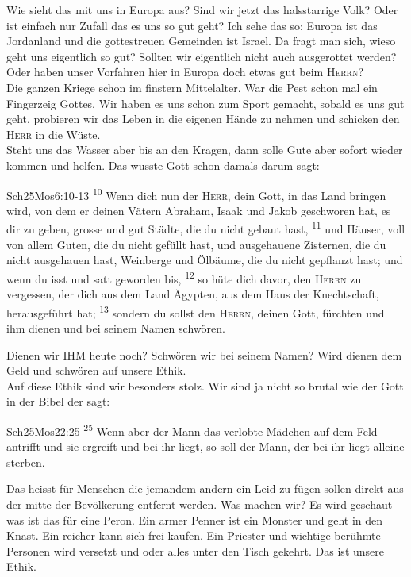 Wie sieht das mit uns in Europa aus? Sind wir jetzt das halsstarrige Volk? Oder ist einfach nur Zufall das es uns so gut geht? Ich sehe das so: Europa ist das Jordanland und die gottestreuen Gemeinden ist Israel.
Da fragt man sich, wieso geht uns eigentlich so gut? Sollten wir eigentlich nicht auch ausgerottet werden? Oder haben unser Vorfahren hier in Europa doch etwas gut beim \textsc{Herrn}?\\
Die ganzen Kriege schon im finstern Mittelalter. War die Pest schon mal ein Fingerzeig Gottes. Wir haben es uns schon zum Sport gemacht, sobald es uns gut geht, probieren wir das Leben in die eigenen Hände zu nehmen und schicken den \textsc{Herr} in die Wüste.\\
Steht uns das Wasser aber bis an den Kragen, dann solle Gute aber sofort wieder kommen und helfen. Das wusste Gott schon damals darum sagt:
\begin{bibeltext}{Sch2}{5Mos}{6:10-13}
    \textsuperscript{10} Wenn dich nun der \textsc{Herr}, dein Gott, in das Land bringen wird, von dem er deinen Vätern Abraham, Isaak und Jakob geschworen hat, es dir zu geben, grosse und gut Städte, die du nicht gebaut hast, \textsuperscript{11} und Häuser, voll von allem Guten, die du nicht gefüllt hast, und ausgehauene Zisternen, die du nicht ausgehauen hast, Weinberge und Ölbäume, die du nicht gepflanzt hast; und wenn du isst und satt geworden bis, \textsuperscript{12} so hüte dich davor, den \textsc{Herrn} zu vergessen, der dich aus dem Land Ägypten, aus dem Haus der Knechtschaft, herausgeführt hat; \textsuperscript{13} sondern du sollst den \textsc{Herrn}, deinen Gott, fürchten und ihm dienen und bei seinem Namen schwören.
\end{bibeltext}
Dienen wir IHM heute noch? Schwören wir bei seinem Namen? Wird dienen dem Geld und schwören auf unsere Ethik.\\
Auf diese Ethik sind wir besonders stolz. Wir sind ja nicht so brutal wie der Gott in der Bibel der sagt:
\begin{bibeltext}{Sch2}{5Mos}{22:25}
    \textsuperscript{25} Wenn aber der Mann das verlobte Mädchen auf dem Feld antrifft und sie ergreift und bei ihr liegt, so soll der Mann, der bei ihr liegt alleine sterben.
\end{bibeltext}
Das heisst für Menschen die jemandem andern ein Leid zu fügen sollen direkt aus der mitte der Bevölkerung entfernt werden. Was machen wir? Es wird geschaut was ist das für eine Peron. Ein armer Penner ist ein Monster und geht in den Knast. Ein reicher kann sich frei kaufen. Ein Priester und wichtige berühmte Personen wird versetzt und oder alles unter den Tisch gekehrt. Das ist unsere Ethik.\\ 

